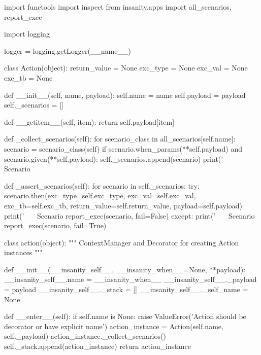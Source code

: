 
\begin{simplecode}

import functools
import inspect
from insanity.apps import all_scenarios, report_exec

import logging

logger = logging.getLogger(__name__)


class Action(object):
    return_value = None
    exc_type = None
    exc_val = None
    exc_tb = None

    def __init__(self, name, payload):
        self.name = name
        self.payload = payload
        self._scenarios = []

    def __getitem__(self, item):
        return self.payload[item]

    def _collect_scenarios(self):
        for scenario_class in all_scenarios[self.name]:
            scenario = scenario_class(self)
            if scenario.when_params(**self.payload) and scenario.given(**self.payload):
                self._scenarios.append(scenario)
                print('~~~ Scenario %

    def _assert_scenarios(self):
        for scenario in self._scenarios:
            try:
                scenario.then(exc_type=self.exc_type, exc_val=self.exc_val, exc_tb=self.exc_tb,
                              return_value=self.return_value, payload=self.payload)
                print('~~~ Scenario %
                report_exec(scenario, fail=False)
            except:
                print('~~~ Scenario %
                report_exec(scenario, fail=True)


class action(object):
    """
    ContextManager and Decorator for creating Action instances
    """

    def __init__(__insanity_self__, __insanity_when__=None, **payload):
        __insanity_self__.name = __insanity_when__
        __insanity_self__._payload = payload
        __insanity_self__._stack = []
        __insanity_self__._self_name = None

    def __enter__(self):
        if self.name is None:
            raise ValueError('Action should be decorator or have explicit name')
        action_instance = Action(self.name, self._payload)
        action_instance._collect_scenarios()
        self._stack.append(action_instance)
        return action_instance


\end{simplecode}
